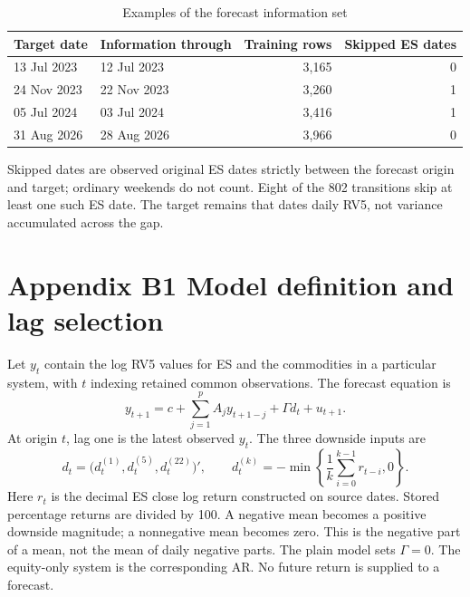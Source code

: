 \documentclass[11pt,letterpaper]{article}
\newcommand{\appendixpage}[2]{\clearpage\section*{#1}\label{#2}}
\begin{document}
\begin{table}[H]
\centering
\caption{Examples of the forecast information set}\label{tab:timing}
\footnotesize
\begin{tabular}{llrr}
\toprule
Target date & Information through & Training rows & Skipped ES dates \\
\midrule
13 Jul 2023 & 12 Jul 2023 & 3,165 & 0 \\
24 Nov 2023 & 22 Nov 2023 & 3,260 & 1 \\
05 Jul 2024 & 03 Jul 2024 & 3,416 & 1 \\
31 Aug 2026 & 28 Aug 2026 & 3,966 & 0 \\
\bottomrule
\end{tabular}
\end{table}
{\footnotesize Skipped dates are observed original ES dates strictly between the forecast origin and target; ordinary weekends do not count. Eight of the 802 transitions skip at least one such ES date. The target remains that date\textquotesingle s daily RV5, not variance accumulated across the gap.\par}


\appendixpage{Appendix B1 Model definition and lag selection}{app:specification}
\setcounter{table}{0}
\setcounter{figure}{0}
Let $y_t$ contain the log RV5 values for ES and the commodities in a particular
system, with $t$ indexing retained common observations. The forecast equation is
\begin{equation}
y_{t+1}=c+\sum_{j=1}^{p} A_j y_{t+1-j}+\Gamma d_t+u_{t+1}.
\label{eq:var}
\end{equation}
At origin $t$, lag one is the latest observed $y_t$. The three downside inputs are
\begin{equation}
d_t=\bigl(d_t^{(1)},d_t^{(5)},d_t^{(22)}\bigr)',\qquad
d_t^{(k)}=-\min\!\left\{\frac{1}{k}\sum_{i=0}^{k-1}r_{t-i},0\right\}.
\label{eq:downside}
\end{equation}
Here $r_t$ is the decimal ES close log return constructed on source dates. Stored
percentage returns are divided by 100. A negative mean becomes a positive downside
magnitude; a nonnegative mean becomes zero. This is the negative part of a mean,
not the mean of daily negative parts. The plain model sets $\Gamma=0$. The equity-only
system is the corresponding AR. No future return is supplied to a forecast.
\end{document}
